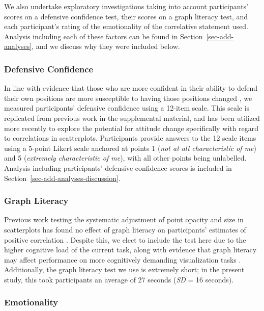 \documentclass[manuscript,screen,review,anonymous]{acmart}
\begin{document}
We also undertake exploratory investigations taking into account
participants' scores on a defensive confidence test, their scores on a
graph literacy test, and each participant's rating of the emotionality
of the correlative statement used. Analysis including each of these
factors can be found in Section~\ref{sec-add-analyses}, and we discuss
why they were included below.

\subsubsection{Defensive Confidence}\label{sec-def-con}

In line with evidence that those who are more confident in their ability
to defend their own positions are more susceptible to having those
positions changed \citep{albarracin_2004}, we measured participants'
defensive confidence using a 12-item scale. This scale is replicated
from previous work in the supplemental material, and has been utilized
more recently \citep{markant_2023} to explore the potential for attitude
change specifically with regard to correlations in scatterplots.
Participants provide answers to the 12 scale items using a 5-point
Likert scale anchored at points 1 (\emph{not at all characteristic of
me}) and 5 (\emph{extremely characteristic of me}), with all other
points being unlabelled. Analysis including participants' defensive
confidence scores is included in
Section~\ref{sec-add-analyses-discussion}.

\subsubsection{Graph Literacy}\label{sec-graph-lit}

Previous work testing the systematic adjustment of point opacity and
size in scatterplots has found no effect of graph literacy on
participants' estimates of positive correlation
\citep{strain_2023, strain_2023b, strain_2024}. Despite this, we elect
to include the test here due to the higher cognitive load of the current
task, along with evidence that graph literacy may affect performance on
more cognitively demanding visualization tasks
\citep{canham_2010, okan_2012}. Additionally, the graph literacy test we
use \citep{garcia_2016} is extremely short; in the present study, this
took participants an average of 27 seconds (\emph{SD} = 16 seconds).

\subsubsection{Emotionality}\label{sec-emotionality}
\end{document}
